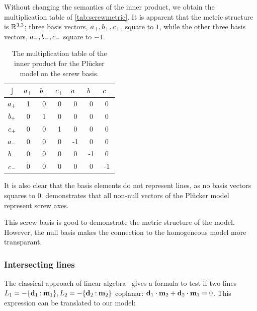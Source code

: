 Without changing the semantics of the inner product, we obtain the multiplication table of \autoref{tab:screwmetric}.  It is apparent that the metric structure is $\mathbb{R}^{3,3}$; three basis vectors, $a_{+}, b_{+}, c_{+}$, square to $1$, while the other three basis vectors, $a_{-}, b_{-}, c_{-}$ square to $-1$.  

\begin{table}
  \caption{The multiplication table of the inner product for the Pl\"ucker model on the screw basis.}
  \label{tab:screwmetric}
  \begin{center}
    \begin{tabular}{|c||c|c|c|c|c|c|}
      \hline
      $\mathbin{\rfloor}$ & $a_{+}$ & $b_{+}$ & $c_{+}$ & $a_{-}$ & $b_{-}$ & $c_{-}$ \\
      \hline \hline
      $a_{+}$ & 1 & 0 & 0 & 0 & 0 & 0 \\
      \hline
      $b_{+}$ & 0 & 1 & 0 & 0 & 0 & 0 \\
      \hline
      $c_{+}$ & 0 & 0 & 1 & 0 & 0 & 0 \\
      \hline
      $a_{-}$ & 0 & 0 & 0 & -1 & 0 & 0 \\
      \hline
      $b_{-}$ & 0 & 0 & 0 & 0 & -1 & 0 \\
      \hline
      $c_{-}$ & 0 & 0 & 0 & 0 & 0 & -1 \\
      \hline
    \end{tabular}
  \end{center}
\end{table}

It is also clear that the basis elements do not represent lines, as no basis vectors squares to $0$.   demonstrates that all non-null vectors of the Pl\"ucker model represent screw axes.  

This screw basis is good to demonstrate the metric structure of the model.  However, the null basis makes the connection to the homogeneous model more transparant.  

\subsubsection{Intersecting lines}
The classical approach of linear algebra~\cite{Shoemake} gives a formula to test if two lines $L_1 = -\{\mathbf{d}_1 \mathbin{:} \mathbf{m}_1\}, L_2 = -\{\mathbf{d}_2 \mathbin{:} \mathbf{m}_2\}$ coplanar: $\mathbf{d}_1 \mathbin{\cdot} \mathbf{m}_2 + \mathbf{d}_2 \mathbin{\cdot} \mathbf{m}_1 = 0$.  This expression can be translated to our model:

